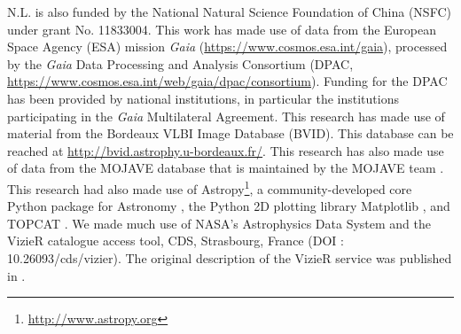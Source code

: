 \documentclass[referee]{aa}        %
\begin{document}
\begin{acknowledgements}
  N.L. is also funded by the National Natural Science Foundation of China (NSFC) under grant No. 11833004.
  This work has made use of data from the European Space Agency (ESA) mission {\it Gaia} (\url{https://www.cosmos.esa.int/gaia}), processed by the {\it Gaia} Data Processing and Analysis Consortium (DPAC, \url{https://www.cosmos.esa.int/web/gaia/dpac/consortium}).
  Funding for the DPAC has been provided by national institutions, in particular the institutions participating in the {\it Gaia} Multilateral Agreement.
  This research has made use of material from the Bordeaux VLBI Image Database (BVID).
  This database can be reached at \url{http://bvid.astrophy.u-bordeaux.fr/}.
  This research has also made use of data from the MOJAVE database that is maintained by the MOJAVE team \citep{2018ApJS..234...12L}.
  This research had also made use of Astropy\footnote{\href{http://www.astropy.org}{http://www.astropy.org}}, a community-developed core Python package for Astronomy \citep{2018AJ....156..123A},
  the Python 2D plotting library Matplotlib \citep{2007CSE.....9...90H}, and TOPCAT \citep{2011ascl.soft01010T}.
  We made much use of NASA's Astrophysics Data System and the VizieR catalogue access tool, CDS,
  Strasbourg, France (DOI : 10.26093/cds/vizier). The original description of the VizieR service was published in \citet{2000A&AS..143...23O}.

\end{acknowledgements}


\end{document}
